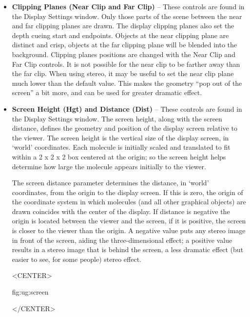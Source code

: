 \begin{itemize}
\item {\bf Clipping Planes (Near Clip and Far Clip)} --
These controls are found in the {\sf Display Settings} window.
Only those parts of the scene between the near and far clipping planes 
are drawn.  
The display clipping planes also set the depth cueing start and endpoints.
Objects at the near clipping plane are distinct and crisp, 
objects at the far clipping plane will be blended into the background.
Clipping planes positions are changed with the {\sf Near Clip} 
and {\sf Far Clip} controls.  It is not possible for the near
clip to be farther away than the far clip.  When using stereo, it may
be useful to set the near clip plane much lower than the default value.
This makes the geometry ``pop out of the screen'' a bit more, 
and can be used for greater dramatic effect.

\item {\bf Screen Height (Hgt) and Distance (Dist)} --
\label{ug:ui:window:screen_size}
These controls are found in the {\sf Display Settings} window.
The screen height, along with the screen distance, defines the geometry
and position of the display screen relative to the viewer.  The screen
height is the vertical size of the display screen, in `world' coordinates.
Each molecule is initially scaled and translated to fit within a 2 x 2 x 2
box centered at the origin; so the screen height helps determine how large
the molecule appears initially to the viewer.  

The screen distance parameter determines the distance, in `world' coordinates, 
from the origin to the display screen.  If this is zero, the origin of the
coordinate system in which molecules (and all other graphical objects) are
drawn coincides with the center of the display.  If distance is negative
the origin is located between the viewer and the screen, if it is 
positive, the screen is closer to the viewer than the origin.
A negative value puts any stereo image in front of the screen, aiding the
three-dimensional effect; a positive value results in a stereo image that is
behind the screen, a less dramatic effect (but easier to see, for some
people) stereo effect.

\begin{rawhtml}
<CENTER>
\end{rawhtml}
{fig:ug:screen}
\begin{rawhtml}
</CENTER>
\end{rawhtml}


\end{itemize}

